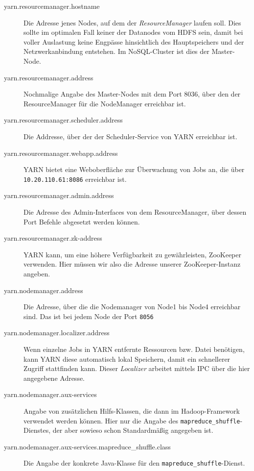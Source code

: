 \begin{description}
	\item[yarn.resourcemanager.hostname] Die Adresse jenes Nodes, auf dem der \textit{ResourceManager} laufen soll.
	Dies sollte im optimalen Fall keiner der Datanodes vom HDFS sein, damit bei voller Auslastung keine Engpässe hinsichtlich
	des Hauptspeichers und der Netzwerkanbindung entstehen. Im NoSQL-Cluster ist dies der Master-Node.
	\item[yarn.resourcemanager.address] Nochmalige Angabe des Master-Nodes mit dem Port 8036, über den der
	ResourceManager für die NodeManager erreichbar ist.
	\item[yarn.resourcemanager.scheduler.address] Die Addresse, über der der Scheduler-Service von YARN erreichbar ist.
	\item[yarn.resourcemanager.webapp.address] YARN bietet eine Weboberfläche zur Überwachung von Jobs an, die über \texttt{10.20.110.61:8086} 
	erreichbar ist.
	\item[yarn.resourcemanager.admin.address] Die Adresse des Admin-Interfaces von dem ResourceManager, über dessen Port Befehle abgesetzt werden können.
	\item[yarn.resourcemanager.zk-address] YARN kann, um eine höhere Verfügbarkeit zu gewährleisten, ZooKeeper verwenden. Hier müssen wir also die Adresse unserer
	ZooKeeper-Instanz angeben.
	\item[yarn.nodemanager.address] Die Adresse, über die die Nodemanager von Node1 bis Node4 erreichbar sind. Das ist bei jedem Node der Port \texttt{8056}
	\item[yarn.nodemanager.localizer.address] Wenn einzelne Jobs in YARN entfernte Ressourcen bzw. Datei benötigen, kann YARN diese automatisch lokal Speichern,
	damit ein schnellerer Zugriff stattfinden kann. Dieser \textit{Localizer} arbeitet mittels IPC über die hier angegebene Adresse.
	\item[yarn.nodemanager.aux-services] Angabe von zusätzlichen Hilfs-Klassen, die dann im Hadoop-Framework verwendet werden können. Hier nur die Angabe des \texttt{mapreduce\_shuffle}-Dienstes, der aber sowieso schon Standardmäßig angegeben ist.
	\item[yarn.nodemanager.aux-services.mapreduce\_shuffle.class] Die Angabe der konkrete Java-Klasse für den \texttt{mapreduce\_shuffle}-Dienst.
\end{description}